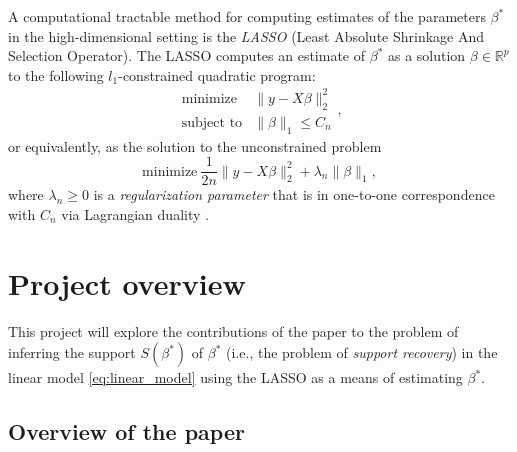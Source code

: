 \documentclass[letterpaper,12pt]{article}
\newcommand{\norm}[1]{\lVert#1\rVert}
\begin{document}
A computational tractable method for computing estimates of the
parameters $\beta^\ast$ in the high-dimensional setting is the
\textit{LASSO} \cite{tibshirani96} (Least Absolute Shrinkage And
Selection Operator). The LASSO computes an estimate of $\beta^\ast$ as
a solution $\beta \in \mathbb{R}^p$ to the following $l_1$-constrained
quadratic program:
\begin{equation} \label{eq:constrained_problem}
  \begin{array}{ll}
    \text{minimize} & \norm{y - X\beta}_2^2 \\
    \text{subject to}
      & \norm{\beta}_1 \leq C_n
  \end{array},
\end{equation}
or equivalently, as the solution to the unconstrained problem
\begin{equation} \label{eq:unconstrained_problem}
  \text{minimize} \
    \frac{1}{2n} \norm{y - X\beta}_2^2 + \lambda_n \norm{\beta}_1,
\end{equation}
where $\lambda_n \geq 0$ is a \textit{regularization parameter} that
is in one-to-one correspondence with $C_n$ via Lagrangian duality
\cite{wainwright06}.

\section*{Project overview}

This project will explore the contributions of the paper
\cite{wainwright06} to the problem of inferring the support
$S(\beta^\ast)$ of $\beta^\ast$ (i.e., the problem of \textit{support
  recovery}) in the linear model \eqref{eq:linear_model} using the
LASSO as a means of estimating $\beta^\ast$.

\subsection*{Overview of the paper}
\end{document}
